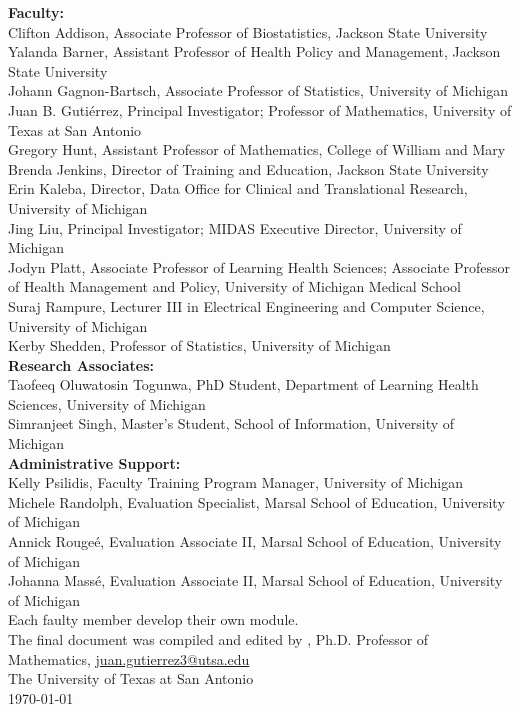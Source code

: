 {\vspace{0.1in}
\noindent
\textbf{Faculty:} \\
Clifton Addison, Associate Professor of Biostatistics, Jackson State University \\
Yalanda Barner, Assistant Professor of Health Policy and Management, Jackson State University \\
Johann Gagnon-Bartsch, Associate Professor of Statistics,  University of Michigan \\
Juan B. Gutiérrez, Principal Investigator; Professor of Mathematics, University of Texas at San Antonio \\
Gregory Hunt, Assistant Professor of Mathematics, College of William and Mary \\
Brenda Jenkins, Director of Training and Education, Jackson State University \\
Erin Kaleba, Director, Data Office for Clinical and Translational Research, University of Michigan \\
Jing Liu, Principal Investigator; MIDAS Executive Director, University of Michigan \\
Jodyn Platt, Associate Professor of Learning Health Sciences; Associate Professor of Health Management and Policy, University of Michigan Medical School \\
Suraj Rampure, Lecturer III in Electrical Engineering and Computer Science, University of Michigan \\
Kerby Shedden, Professor of Statistics, University of Michigan \\
\textbf{Research Associates:} \\
Taofeeq Oluwatosin Togunwa, PhD Student, Department of Learning Health Sciences, University of Michigan \\
Simranjeet Singh, Master's Student, School of Information, University of Michigan \\
\textbf{Administrative Support:} \\
Kelly Psilidis, Faculty Training Program Manager, University of Michigan \\
Michele Randolph, Evaluation Specialist, Marsal School of Education, University of Michigan \\
Annick Rougeé, Evaluation Associate II, Marsal School of Education, University of Michigan \\
Johanna Massé, Evaluation Associate II, Marsal School of Education, University of Michigan \\

\vspace{0.1in}
\noindent
Each faulty member develop their own module. \\
The final document was compiled and edited by \href{https://biomathematicus.me/}{\TheAuthor}, Ph.D. Professor of Mathematics, \href{mailto:juan.gutierrez3@utsa.edu}{juan.gutierrez3@utsa.edu} \\
The University of Texas at San Antonio \\
\today
}



